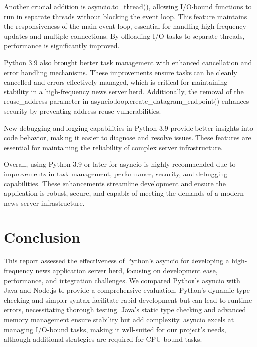 \documentclass[letterpaper,twocolumn,10pt]{article}
\begin{document}
\noindent{}Another crucial addition is asyncio.to\_thread(), allowing I/O-bound functions to run in separate threads without blocking the event loop. This feature maintains the responsiveness of the main event loop, essential for handling high-frequency updates and multiple connections. By offloading I/O tasks to separate threads, performance is significantly improved.
\vspace{5pt}

\noindent{}Python 3.9 also brought better task management with enhanced cancellation and error handling mechanisms. These improvements ensure tasks can be cleanly cancelled and errors effectively managed, which is critical for maintaining stability in a high-frequency news server herd. Additionally, the removal of the reuse\_address parameter in asyncio.loop.create\_datagram\_endpoint() enhances security by preventing address reuse vulnerabilities.
\vspace{5pt}

\noindent{}New debugging and logging capabilities in Python 3.9 provide better insights into code behavior, making it easier to diagnose and resolve issues. These features are essential for maintaining the reliability of complex server infrastructure.
\vspace{5pt}

\noindent{}Overall, using Python 3.9 or later for asyncio is highly recommended due to improvements in task management, performance, security, and debugging capabilities. These enhancements streamline development and ensure the application is robust, secure, and capable of meeting the demands of a modern news server infrastructure.

\section{Conclusion}
\noindent{}This report assessed the effectiveness of Python's asyncio for developing a high-frequency news application server herd, focusing on development ease, performance, and integration challenges. We compared Python's asyncio with Java and Node.js to provide a comprehensive evaluation. Python's dynamic type checking and simpler syntax facilitate rapid development but can lead to runtime errors, necessitating thorough testing. Java's static type checking and advanced memory management ensure stability but add complexity. asyncio excels at managing I/O-bound tasks, making it well-suited for our project’s needs, although additional strategies are required for CPU-bound tasks.
\vspace{5pt}
\end{document}
